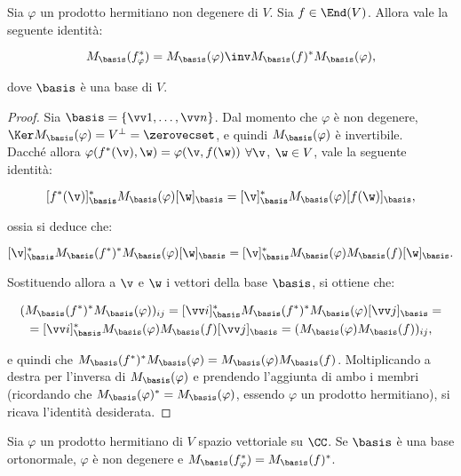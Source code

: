\documentclass[11pt]{article}
\begin{document}
	\begin{proposition}
		Sia $\varphi$ un prodotto hermitiano non degenere di $V$. Sia $f \in \End(V)$. Allora
		vale la seguente identità:
		
		\[ M_\basis(f_\varphi^*) = M_\basis(\varphi)\inv M_\basis(f)^* M_\basis(\varphi), \]
		
		dove $\basis$ è una base di $V$.
	\end{proposition}

	\begin{proof} Sia $\basis = \{ \vv 1, \ldots, \vv n\}$.
		Dal momento che $\varphi$ è non degenere, $\Ker M_\basis(\varphi) = V^\perp = \zerovecset$, e quindi
		$M_\basis(\varphi)$ è invertibile. \\
		
		Dacché allora $\varphi(f^*(\v), \w) = \varphi(\v, f(\w))$ $\forall \v$, $\w \in V$,
		vale la seguente identità:
		
		\[ [f^*(\v)]_\basis^* M_\basis(\varphi) [\w]_\basis = [\v]_\basis^* M_\basis(\varphi) [f(\w)]_\basis, \]
		
		ossia si deduce che:
		
		\[ [\v]_\basis^* M_\basis(f^*)^* M_\basis(\varphi) [\w]_\basis = [\v]_\basis^* M_\basis(\varphi) M_\basis(f) [\w]_\basis. \]
		
		Sostituendo allora a $\v$ e $\w$ i vettori della base $\basis$, si ottiene che:
		
		\begin{gather*}
			(M_\basis(f^*)^* M_\basis(\varphi))_{ij} = [\vv i]_\basis^* M_\basis(f^*)^* M_\basis(\varphi) [\vv j]_\basis = \\ = [\vv i]_\basis^* M_\basis(\varphi) M_\basis(f) [\vv j]_\basis = (M_\basis(\varphi) M_\basis(f))_{ij},
		\end{gather*}
	
		e quindi che $M_\basis(f^*)^* M_\basis(\varphi) = M_\basis(\varphi) M_\basis(f)$. Moltiplicando
		a destra per l'inversa di $M_\basis(\varphi)$ e prendendo l'aggiunta di ambo i membri (ricordando
		che $M_\basis(\varphi)^* = M_\basis(\varphi)$, essendo $\varphi$ un prodotto hermitiano), si ricava
		l'identità desiderata.

	\end{proof}

	\begin{corollary} Sia $\varphi$ un prodotto hermitiano di $V$ spazio vettoriale su $\CC$.
		Se $\basis$ è una base ortonormale, $\varphi$ è non degenere e $M_\basis(f_\varphi^*) = M_\basis(f)^*$.
	\end{corollary}
	
\end{document}
